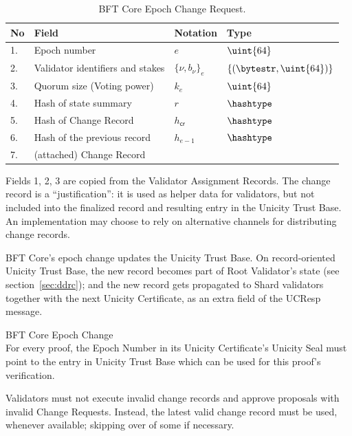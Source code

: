 \begin{table}[!htbp]
	\begin{center}
		\caption{BFT Core Epoch Change Request.}\label{ta:rc-ecr}
		\begin{tabular}{|p{0.5cm}|p{8cm}|p{1.7cm}|p{3.5cm}|}\hline
			No & Field                          & Notation  & Type                  \\\hline\hline
			1. & Epoch number                   & $e$       & $\uint{64}$           \\\hline
			2. & Validator identifiers and stakes& $\{\nu, b_\nu\}_e$ & $\{ (\bytestr, \uint{64}) \}$  \\\hline
			3. & Quorum size (Voting power)     & $k_e$     & $\uint{64}$           \\\hline
			4. & Hash of state summary          & $r$       & $\hashtype$          \\\hline
			5. & Hash of Change Record         & $h_{\mathsf{cr}}$ & $\hashtype$ \\\hline
			6. & Hash of the previous record    & $h_{e-1}$ & $\hashtype$          \\\hline
			7. & (attached) Change Record      &           &   \\\hline
		\end{tabular}
	\end{center}
\end{table}

Fields 1, 2, 3 are copied from the Validator Assignment Records. The change record is a ``justification'': it is used as helper data for validators, but not included into the finalized record and resulting entry in the Unicity Trust Base. An implementation may choose to rely on alternative channels for distributing change records.

BFT Core's epoch change updates the Unicity Trust Base. On record-oriented Unicity Trust Base, the new record becomes part of Root Validator's state (see section~\ref{sec:ddrc}); and the new record gets propagated to Shard validators together with the next Unicity Certificate, as an extra field of the UCResp message.

\begin{ruledef*}{BFT Core Epoch Change} \\
  For every proof, the Epoch Number in its Unicity Certificate's Unicity Seal must point to the entry in Unicity Trust Base which can be used for this proof's verification.
\end{ruledef*}

Validators must not execute invalid change records and approve proposals with invalid Change Requests. Instead, the latest valid change record must be used, whenever available; skipping over of some if necessary.


